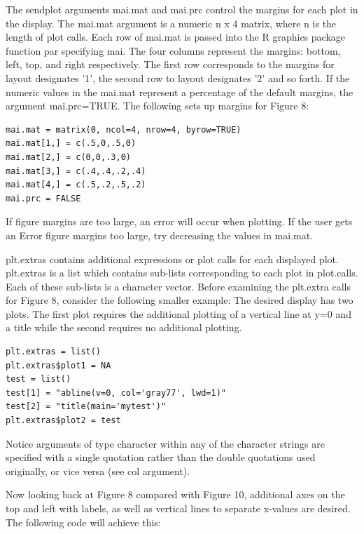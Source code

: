 \documentclass[]{article}
\begin{document}
\indent The sendplot arguments mai.mat and mai.prc control the margins for each plot in the display. The mai.mat argument is a numeric n x 4 matrix, where n is the length of plot calls. Each row of mai.mat is passed into the R graphics package function par specifying mai. The four columns represent the margins: bottom, left, top, and right respectively. The first row corresponds to the margins for layout designates '1', the second row to layout designates '2' and so forth. If the numeric values in the mai.mat represent a percentage of the default margins, the argument mai.prc=TRUE. The following sets up margins for Figure 8:
\begin{verbatim}
mai.mat = matrix(0, ncol=4, nrow=4, byrow=TRUE)
mai.mat[1,] = c(.5,0,.5,0)
mai.mat[2,] = c(0,0,.3,0)
mai.mat[3,] = c(.4,.4,.2,.4)
mai.mat[4,] = c(.5,.2,.5,.2)
mai.prc = FALSE
\end{verbatim}



 If figure margins are too large, an error will occur when plotting.  If the user gets an Error figure margins too large, try decreasing the values in mai.mat.


\indent plt.extras contains additional expressions or plot calls for each displayed plot. plt.extras is a list which contains sub-lists corresponding to each plot in plot.calls. Each of these sub-lists is a character vector. Before examining the plt.extra calls for Figure 8, consider the following smaller example: The desired display has two plots. The first plot requires the additional plotting of a vertical line at y=0 and a title while the second requires no additional plotting.

\begin{verbatim}
plt.extras = list()
plt.extras$plot1 = NA
test = list()
test[1] = "abline(v=0, col='gray77', lwd=1)"
test[2] = "title(main='mytest')"
plt.extras$plot2 = test
\end{verbatim}  

\indent Notice arguments of type character within any of the character strings are specified with a single quotation rather than the double quotations used originally, or vice versa (see col argument).

\indent Now looking back at Figure 8 compared with Figure 10, additional axes on the top and left with labels, as well as vertical lines to separate x-values are desired. The following code will achieve this:  
\end{document}
